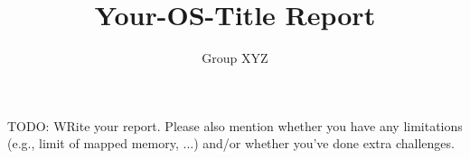 \documentclass[10pt,a4paper,titlepage]{report}
\title{Your-OS-Title Report}
\author{Group XYZ}
\begin{document}
	
	\maketitle
	
	TODO: WRite your report. Please also mention whether you have any limitations
	(e.g., limit of mapped memory, ...) and/or whether you've done extra challenges.
	
	
	
	
	
	
	
	

		
	 
	
	
	
	
\end{document}
